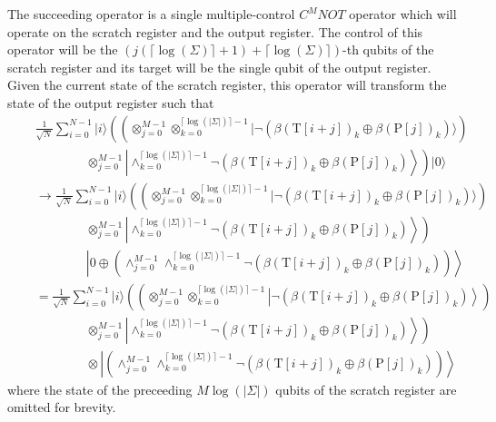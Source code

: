 The succeeding operator is a single multiple-control $C^{M}NOT$ operator which will operate on the scratch register and the output register. The control of this operator will be the $(j(\lceil\log(\Sigma)\rceil + 1) + \lceil\log(\Sigma)\rceil)$-th qubits of the scratch register and its target will be the single qubit of the output register. Given the current state of the scratch register, this operator will transform the state of the output register such that
\begin{align*}
	\quad &\frac{1}{\sqrt{N}} \sum_{i=0}^{N-1} \vert i \rangle \left( \left(\otimes_{j=0}^{M-1}\otimes_{k=0}^{\lceil \log(\vert\Sigma\vert) \rceil-1} \vert \neg\left( \beta(\text{T}[i+j])_k \oplus \beta(\text{P}[j])_{k} \right) \rangle \right)\right.\\
	\quad & \quad\quad\quad\quad \left.\otimes_{j=0}^{M-1} \left\vert \wedge_{k=0}^{\lceil \log(\vert\Sigma\vert) \rceil-1} \neg\left( \beta(\text{T}[i+j])_k \oplus \beta(\text{P}[j])_{k} \right) \right\rangle \right)  \vert 0 \rangle \\
	\quad &\rightarrow \frac{1}{\sqrt{N}} \sum_{i=0}^{N-1} \vert i \rangle \left( \left(\otimes_{j=0}^{M-1}\otimes_{k=0}^{\lceil \log(\vert\Sigma\vert) \rceil-1} \vert \neg\left( \beta(\text{T}[i+j])_k \oplus \beta(\text{P}[j])_{k} \right) \rangle \right) \right.\\
	\quad & \quad\quad\quad\quad \left.\otimes_{j=0}^{M-1} \left\vert \wedge_{k=0}^{\lceil \log(\vert\Sigma\vert) \rceil-1} \neg\left( \beta(\text{T}[i+j])_k \oplus \beta(\text{P}[j])_{k} \right) \right\rangle \right)\\
	\quad & \quad\quad\quad\quad \left\vert 0 \oplus \left(\wedge_{j=0}^{M-1} \wedge_{k=0}^{\lceil \log(\vert\Sigma\vert) \rceil-1} \neg\left( \beta(\text{T}[i+j])_k \oplus \beta(\text{P}[j])_{k} \right) \right) \right\rangle\\
	\quad &= \frac{1}{\sqrt{N}} \sum_{i=0}^{N-1} \vert i \rangle \left( \left(\otimes_{j=0}^{M-1}\otimes_{k=0}^{\lceil \log(\vert\Sigma\vert) \rceil-1} \left\vert \neg\left( \beta(\text{T}[i+j])_k \oplus \beta(\text{P}[j])_{k} \right) \right\rangle \right) \right.\\
	\quad & \quad\quad\quad\quad \left. \otimes_{j=0}^{M-1} \left\vert \wedge_{k=0}^{\lceil \log(\vert\Sigma\vert) \rceil-1} \neg\left( \beta(\text{T}[i+j])_k \oplus \beta(\text{P}[j])_{k} \right) \right\rangle \right)\\
	\quad & \quad\quad\quad\quad \otimes \left\vert \left(\wedge_{j=0}^{M-1} \wedge_{k=0}^{\lceil \log(\vert\Sigma\vert) \rceil-1} \neg\left( \beta(\text{T}[i+j])_k \oplus \beta(\text{P}[j])_{k} \right) \right) \right\rangle
\end{align*}
where the state of the preceeding $M\log(\vert\Sigma\vert)$ qubits of the scratch register are omitted for brevity.

